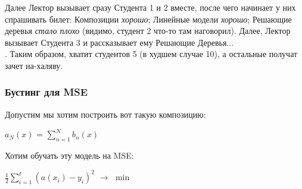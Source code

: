 \begin{enumerate}
            Далее Лектор вызывает сразу Студента 1 и 2 вместе, после чего начинает у них спрашивать билет: Композиции \textit{хорошо}; Линейные модели \textit{хорошо}; Решающие деревья \textit{стало плохо} (видимо, студент 2 что-то там наговорил). Далее, Лектор вызывает Студента 3 и рассказывает ему Решающие Деревья...\\

            . Таким образом, хватит студентов 5 (в худшем случае 10), а остальные получат зачет на-халяву.
            \end{enumerate}

    \subsubsection{Бустинг для MSE}

        Допустим мы хотим построить вот такую композицию:
        \begin{center}
            $a_N(x)$ = $\sum\limits_{n = 1}^Nb_n(x)$
        \end{center}

        Хотим обучать эту модель на MSE:
        \begin{center}
            $\frac{1}{2}\sum\limits_{i = 1}^\ell(a(x_i) - y_i)^2$ $\longrightarrow$ $\min$
        \end{center}

